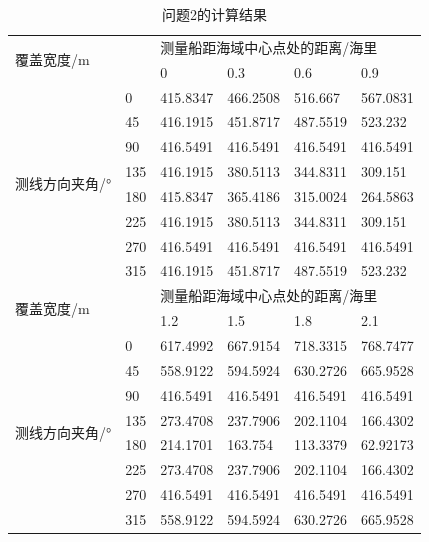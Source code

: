 \documentclass{article}
\begin{document}
\begin{table}[H]
	\centering
	\caption{问题2的计算结果} \label{ansSheet2}
	\begin{tabular}{llllll}
		\hline
		\multicolumn{2}{l}{\multirow{2}{*}{覆盖宽度/m}} & \multicolumn{4}{l}{测量船距海域中心点处的距离/海里}      \\
		\multicolumn{2}{l}{}                        & 0        & 0.3      & 0.6      & 0.9      \\ \hline
		\multirow{8}{*}{测线方向夹角/°}       & 0         & 415.8347 & 466.2508 & 516.667  & 567.0831 \\
		& 45        & 416.1915 & 451.8717 & 487.5519 & 523.232  \\
		& 90        & 416.5491 & 416.5491 & 416.5491 & 416.5491 \\
		& 135       & 416.1915 & 380.5113 & 344.8311 & 309.151  \\
		& 180       & 415.8347 & 365.4186 & 315.0024 & 264.5863 \\
		& 225       & 416.1915 & 380.5113 & 344.8311 & 309.151  \\
		& 270       & 416.5491 & 416.5491 & 416.5491 & 416.5491 \\
		& 315       & 416.1915 & 451.8717 & 487.5519 & 523.232  \\ \hline
		\multicolumn{2}{l}{\multirow{2}{*}{覆盖宽度/m}} & \multicolumn{4}{l}{测量船距海域中心点处的距离/海里}      \\
		\multicolumn{2}{l}{}                        & 1.2      & 1.5      & 1.8      & 2.1      \\ \hline
		\multirow{8}{*}{测线方向夹角/°}       & 0         & 617.4992 & 667.9154 & 718.3315 & 768.7477 \\
		& 45        & 558.9122 & 594.5924 & 630.2726 & 665.9528 \\
		& 90        & 416.5491 & 416.5491 & 416.5491 & 416.5491 \\
		& 135       & 273.4708 & 237.7906 & 202.1104 & 166.4302 \\
		& 180       & 214.1701 & 163.754  & 113.3379 & 62.92173 \\
		& 225       & 273.4708 & 237.7906 & 202.1104 & 166.4302 \\
		& 270       & 416.5491 & 416.5491 & 416.5491 & 416.5491 \\
		& 315       & 558.9122 & 594.5924 & 630.2726 & 665.9528 \\ \hline
	\end{tabular}
\end{table}
\end{document}
